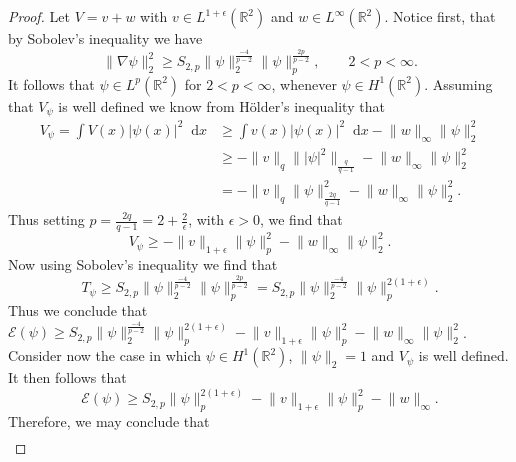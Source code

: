 \documentclass[a4paper,11pt]{article}
\newcommand*\diff{\mathop{}\!\mathrm{d}}
\newcommand{\R}{\mathbb{R}}
\numberwithin{equation}{section}
\begin{document}
\begin{proof}
	Let $ V=v+w $ with $ v\in L^{1+\epsilon}(\R^2)  $ and $ w\in L^\infty(\R^2) $. Notice first, that by Sobolev's inequality we have \begin{equation}
	\lVert\nabla\psi\rVert_2^2\geq S_{2,p}\lVert\psi\rVert_2^{\frac{-4}{p-2}}\lVert\psi\rVert_p^{\frac{2p}{p-2}},\qquad 2<p<\infty.
	\end{equation}
	It follows that $ \psi\in L^p(\R^2) $ for $ 2<p<\infty $, whenever $ \psi\in H^1(\R^2) $.
	Assuming that $ V_\psi $ is well defined we know from H\"older's inequality that\begin{equation}
	\begin{aligned}
	V_\psi=\int V(x)\lvert\psi(x)\rvert^2 \diff x&\geq\int v(x)\lvert\psi(x)\rvert^2 \diff x-\lVert w\rVert_\infty \lVert \psi\rVert_2^2\\&\geq-\lVert v\rVert_q\lVert|\psi|^2\rVert_{\frac{q}{q-1}}-\lVert w\rVert_\infty \lVert \psi\rVert_2^2\\&=-\lVert v\rVert_q\lVert\psi\rVert_{\frac{2q}{q-1}}^{2}-\lVert w\rVert_\infty \lVert \psi\rVert_2^2.
	\end{aligned}
	\end{equation} Thus setting $ p=\frac{2q}{q-1}=2+\frac{2}{\epsilon} $,
	 with $ \epsilon>0 $, we find that \begin{equation}
	V_\psi\geq-\lVert v\rVert_{1+\epsilon}\lVert \psi\rVert_p^2-\lVert w\rVert_\infty \lVert \psi\rVert_2^2.
	\end{equation}
	Now using Sobolev's inequality we find that\begin{equation}
	T_\psi\geq S_{2,p}\lVert \psi\rVert_2^{\frac{-4}{p-2}}\lVert \psi \rVert_p^{\frac{2p}{p-2}}=S_{2,p}\lVert \psi\rVert_2^{\frac{-4}{p-2}}\lVert \psi \rVert_p^{2(1+\epsilon)}.
	\end{equation}
	Thus we conclude that $ \mathcal{E}(\psi)\geq S_{2,p}\lVert \psi\rVert_2^{\frac{-4}{p-2}}\lVert \psi \rVert_p^{2(1+\epsilon)}-\lVert v\rVert_{1+\epsilon}\lVert \psi\rVert_p^2-\lVert w\rVert_\infty \lVert \psi\rVert_2^2 $.
	Consider now the case in which $ \psi\in H^1(\R^2) $, $ \lVert \psi \rVert_2=1 $ and $ V_\psi $ is well defined. It then follows that \begin{equation}
	\mathcal{E}(\psi)\geq S_{2,p}\lVert \psi \rVert_p^{2(1+\epsilon)}-\lVert v\rVert_{1+\epsilon}\lVert \psi\rVert_p^2-\lVert w\rVert_\infty.
	\end{equation}
	Therefore, we may conclude that \begin{equation}
	\begin{aligned}

\end{aligned}
\end{equation}
\end{proof}
\end{document}
